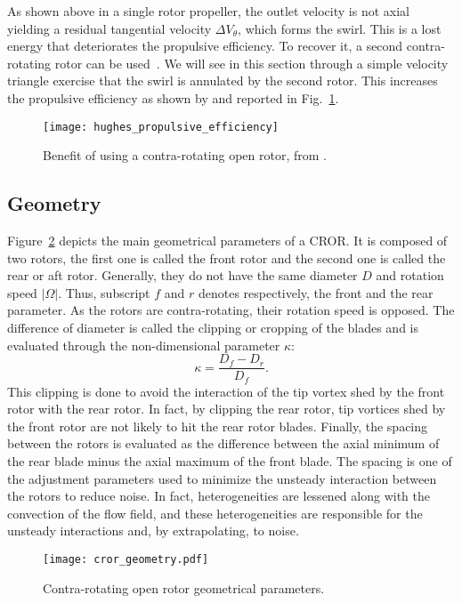 
As shown above in a single rotor propeller, the outlet velocity is not axial
yielding a residual tangential velocity $\Delta V_{\theta}$,
which forms the swirl. 
This is a lost energy that deteriorates the propulsive efficiency. 
To recover it, a second contra-rotating rotor can be used~\cite{Hager1988}.
We will see in this section through a simple velocity triangle exercise that
the swirl is annulated by the second rotor. This increases the propulsive
efficiency as shown by \citet{Hughes1989} and reported 
in Fig.~\ref{fig:hughes_propulsive_efficiency}.
\begin{figure}[htp]
  \centering
  \texttt{[image: hughes\_propulsive\_efficiency]}
  \caption{Benefit of using a contra-rotating open rotor, from \citet{Hughes1989}.}
  \label{fig:hughes_propulsive_efficiency}
\end{figure}

\subsection{Geometry}
\label{sub:cror_geometry}

Figure~\ref{fig:cror_geometry} depicts the main
geometrical parameters of a CROR.
It is composed of two rotors, the first one is called
the front rotor and the second one is called the rear or aft rotor.
Generally, they do not have the same diameter $D$ and rotation speed
$| \Omega |$. Thus, subscript $f$ and $r$ denotes respectively,
the front and the rear parameter.
As the rotors are contra-rotating, their rotation speed is opposed.
The difference of diameter is called the clipping or cropping
of the blades and is evaluated through the non-dimensional parameter
$\kappa$:
\begin{equation}
    \kappa = \frac{D_f - D_r}{D_f}.
\end{equation}
This clipping is done to avoid the interaction 
of the tip vortex shed
by the front rotor with the rear rotor. In fact, by clipping the rear
rotor, tip vortices shed by the front rotor are not likely
to hit the rear rotor blades.
Finally, the spacing between the rotors
is evaluated as the difference between the axial minimum of the
rear blade minus the axial maximum of the front blade. The spacing
is one of the adjustment parameters used to minimize the unsteady
interaction between the rotors to reduce noise. In fact, 
heterogeneities are lessened along with the convection of
the flow field, and these heterogeneities are responsible
for the unsteady interactions and, by extrapolating, to noise.
\begin{figure}[htp]
  \centering
  \texttt{[image: cror\_geometry.pdf]}
  \caption{Contra-rotating open rotor geometrical parameters.}
  \label{fig:cror_geometry}
\end{figure}

